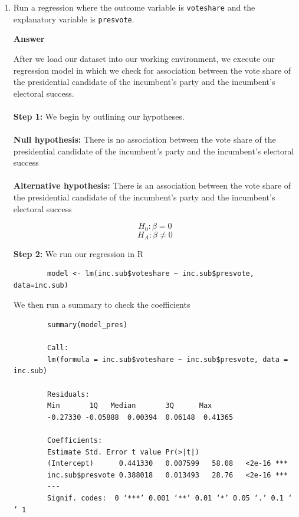 \documentclass[12pt,letterpaper]{article}
\begin{document}
	\begin{enumerate}
		\item Run a regression where the outcome variable is \texttt{voteshare} and the explanatory variable is \texttt{presvote}. \\
	
\noindent 

	\textbf{Answer}
	
	After we load our dataset into our working environment, we execute our regression
	model in which we check for association between the vote share of the presidential candidate of the incumbent's party and the incumbent's electoral success. \\
	\\
	
	\textbf{Step 1:} We begin by outlining our hypotheses. \\
	\\
	
	\textbf{Null hypothesis: }
	There is no association between the vote share of the presidential candidate of the incumbent’s party and the incumbent’s electoral success \\
	\\
	
	\textbf{Alternative hypothesis: }
	There is an association between the vote share of the presidential candidate of the incumbent’s party and the incumbent’s electoral success
	
	$$H_0: \beta = 0$$
	$$H_A: \beta \neq 0$$
	
	\vspace{.25cm}
	
	
	\textbf{Step 2:} We run our regression in R

	
	\begin{verbatim}
		model <- lm(inc.sub$voteshare ~ inc.sub$presvote, data=inc.sub)		
	\end{verbatim}
	
	We then run a summary to check the coefficients
	
	\begin{verbatim}
		summary(model_pres)
		
		Call:
		lm(formula = inc.sub$voteshare ~ inc.sub$presvote, data = inc.sub)
		
		Residuals:
		Min       1Q   Median       3Q      Max 
		-0.27330 -0.05888  0.00394  0.06148  0.41365 
		
		Coefficients:
		Estimate Std. Error t value Pr(>|t|)    
		(Intercept)      0.441330   0.007599   58.08   <2e-16 ***
		inc.sub$presvote 0.388018   0.013493   28.76   <2e-16 ***
		---
		Signif. codes:  0 ‘***’ 0.001 ‘**’ 0.01 ‘*’ 0.05 ‘.’ 0.1 ‘ ’ 1
		

\end{verbatim}
\end{enumerate}
\end{document}
